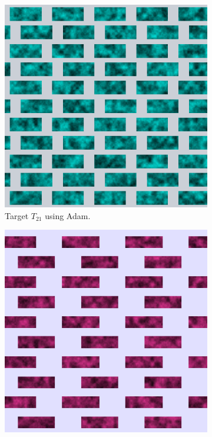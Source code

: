 \begin{figure}
\centering
\begin{subfigure}[t]{.25\textwidth}
    \centering
    \includegraphics[width=\linewidth]{img/evaluation/M2/2param/Neural_Adam_final_render.png}
    \caption{Target $T_{21}$ using Adam.}
    \label{fig:M2NeuralFinalRenders2paramAdam}
\end{subfigure}\hspace{0.5cm}
\begin{subfigure}[t]{.25\textwidth}
    \centering
    \includegraphics[width=\linewidth]{img/evaluation/M2/random/Neural_Adam_Random_best.png}

\end{subfigure}
\end{figure}
